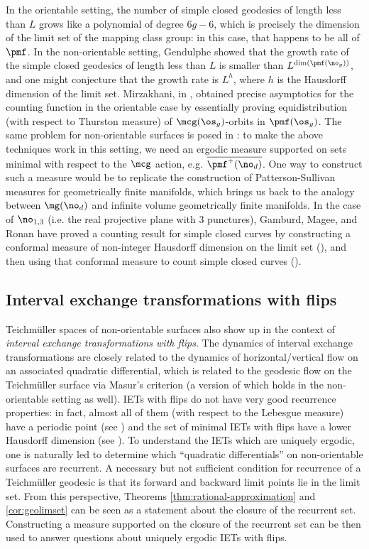 \documentclass[12pt, reqno]{amsart}
\begin{document}
In the orientable setting, the number of simple closed geodesics of length less than $L$ grows like a polynomial of degree $6g-6$, which is precisely the dimension of the limit set of the mapping class group: in this case, that happens to be all of $\pmf$.
In the non-orientable setting, Gendulphe showed that the growth rate of the simple closed geodesics of length less than $L$ is smaller than $L^{\dim(\pmf(\no_g))}$, and one might conjecture that the growth rate is $L^h$, where $h$ is the Hausdorff dimension of the limit set.
Mirzakhani, in \autocite{mirzakhani2008growth}, obtained precise asymptotics for the counting function in the orientable case by essentially proving equidistribution (with respect to Thurston measure) of $\mcg(\os_{g})$-orbits in $\pmf(\os_g)$.
The same problem for non-orientable surfaces is posed in \cite[Problem 9.2]{wright2020tour}: to make the above techniques work in this setting, we need an ergodic measure supported on sets
minimal with respect to the $\mcg$ action, e.g. $\overline{\pmf^+(\no_d)}$.
One way to construct such a measure would be to replicate the construction of Patterson-Sullivan measures for geometrically finite manifolds, which brings us back
to the analogy between $\mg(\no_d)$ and infinite volume geometrically finite manifolds.
In the case of $\no_{1,3}$ (i.e. the real projective plane with $3$ punctures), Gamburd, Magee, and Ronan have proved a counting result for simple closed curves by constructing a conformal measure of non-integer Hausdorff dimension on the limit set (\cite[Theorem 10]{10.4007/annals.2019.190.3.2}), and then using that conformal measure to count simple closed curves (\cite[Theorem 2]{10.1093/imrn/rny112}).

\subsection*{Interval exchange transformations with flips}

Teichm\"uller spaces of non-orientable surfaces also show up in the context of \emph{interval exchange transformations with flips}.
The dynamics of interval exchange transformations are closely related to the dynamics of horizontal/vertical flow on an associated quadratic differential, which is related to the geodesic flow on the Teichm\"uller surface via Masur's criterion (a version of which holds in the non-orientable setting as well).
IETs with flips do not have very good recurrence properties: in fact, almost all of them (with respect to the Lebesgue measure) have a periodic point (see \cite{nogueira_1989}) and the set of minimal IETs with flips have a lower Hausdorff dimension (see \cite{skripchenko2018hausdorff}).
To understand the IETs which are uniquely ergodic, one is naturally led to determine which ``quadratic differentials'' on non-orientable surfaces are recurrent.
A necessary but not sufficient condition for recurrence of a Teichm\"uller geodesic is that its forward and backward limit points lie in the limit set.
From this perspective, Theorems \ref{thm:rational-approximation} and \ref{cor:geolimset} can
be seen as a statement about the closure of the recurrent set.
Constructing a measure supported on the closure of the recurrent set can be then used to answer questions about uniquely ergodic IETs with flips.
\end{document}
